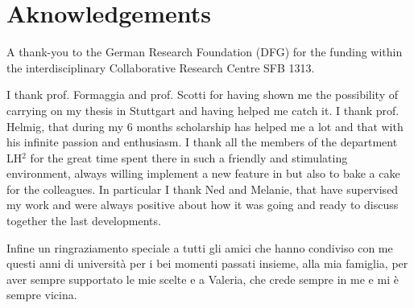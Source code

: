 \chapter*{Aknowledgements}
A thank-you to the German Research Foundation (DFG) for the funding within the interdisciplinary Collaborative Research Centre SFB 1313.

I thank prof. Formaggia and prof. Scotti for having shown me the possibility of carrying on my thesis in Stuttgart and having helped me catch it.
I thank prof. Helmig, that during my 6 months scholarship has helped me a lot and that with his infinite passion and enthusiasm.
I thank all the members of the department LH$^2$ for the great time spent there in such a friendly and stimulating environment, always willing implement a new feature in \DUMUX but also to bake a cake for the colleagues. In particular I thank Ned and Melanie, that have supervised my work and were always positive about how it was going and ready to discuss together the last developments.

Infine un ringraziamento speciale a tutti gli amici che hanno condiviso con me questi anni di università per i bei momenti passati insieme, alla mia famiglia, per aver sempre supportato le mie scelte e a Valeria, che crede sempre in me e mi è sempre vicina.
